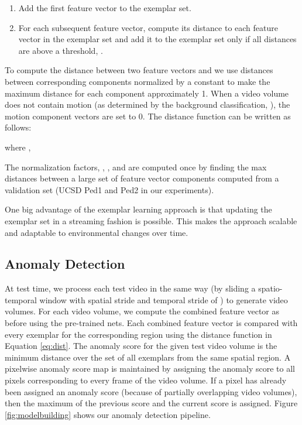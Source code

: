 \vspace{-4pt}
\begin{enumerate}
\itemsep-0em 
    \item Add the first feature vector to the exemplar set.
    \item For each subsequent feature vector, compute its distance to each feature vector in the exemplar set and add it to the exemplar set only if all distances are above a threshold, .
\end{enumerate}
\vspace{-4pt}

To compute the distance between two feature vectors  and  we use  distances between corresponding components normalized by a constant to make the maximum distance for each component approximately 1.  When a video volume does not contain motion (as determined by the background classification, ), the motion component vectors are set to 0.    The distance function can be written as follows:

where ,

The normalization factors, , ,  and  are computed once by finding the max  distances between a large set of feature vector components computed from a validation set (UCSD Ped1 and Ped2 in our experiments). 

One big advantage of the exemplar learning approach is that updating the exemplar set in a streaming fashion is possible. This makes the approach scalable and adaptable to environmental changes over time.

\subsection{Anomaly Detection}
At test time, we process each test video in the same way (by sliding a  spatio-temporal window with spatial stride  and temporal stride of ) to generate video volumes. For each video volume, we compute the combined feature vector as before using the pre-trained nets. Each combined feature vector is compared with every exemplar for the corresponding region using the distance function in Equation \ref{eq:dist}. The anomaly score for the given test video volume is the minimum distance over the set of all exemplars from the same spatial region.  A pixelwise anomaly score map is maintained by assigning the anomaly score to all pixels corresponding to every frame of the video volume. If a pixel has already been assigned an anomaly score (because of partially overlapping video volumes), then the maximum of the previous score and the current score is assigned.  Figure \ref{fig:modelbuilding} shows our anomaly detection pipeline.
\label{sec:method}

